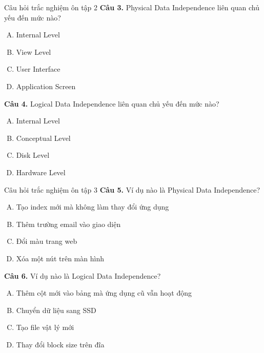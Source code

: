 \documentclass[aspectratio=169,11pt]{beamer}
\begin{document}
\begin{frame}{Câu hỏi trắc nghiệm ôn tập 2}
\small
\textbf{Câu 3.} Physical Data Independence liên quan chủ yếu đến mức nào?
\begin{enumerate}[A.]
  \item Internal Level
  \item View Level
  \item User Interface
  \item Application Screen
\end{enumerate}

\textbf{Câu 4.} Logical Data Independence liên quan chủ yếu đến mức nào?
\begin{enumerate}[A.]
  \item Internal Level
  \item Conceptual Level
  \item Disk Level
  \item Hardware Level
\end{enumerate}
\end{frame}

\begin{frame}{Câu hỏi trắc nghiệm ôn tập 3}
\small
\textbf{Câu 5.} Ví dụ nào là Physical Data Independence?
\begin{enumerate}[A.]
  \item Tạo index mới mà không làm thay đổi ứng dụng
  \item Thêm trường email vào giao diện
  \item Đổi màu trang web
  \item Xóa một nút trên màn hình
\end{enumerate}

\textbf{Câu 6.} Ví dụ nào là Logical Data Independence?
\begin{enumerate}[A.]
  \item Thêm cột mới vào bảng mà ứng dụng cũ vẫn hoạt động
  \item Chuyển dữ liệu sang SSD
  \item Tạo file vật lý mới
  \item Thay đổi block size trên đĩa
\end{enumerate}
\end{frame}
\end{document}
